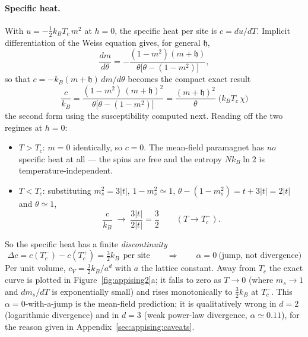 \documentclass[10pt,a4paper]{article}
\theoremstyle{remark}
\begin{document}
\paragraph{Specific heat.} With $u=-\tfrac12k_BT_c\,m^{2}$ at $h=0$, the specific
heat per site is $c=du/dT$. Implicit differentiation of the Weiss equation gives,
for general $\mathfrak{h}$,
\[
\frac{dm}{d\theta}=-\frac{(1-m^{2})(m+\mathfrak{h})}
{\theta\big[\theta-(1-m^{2})\big]} ,
\]
so that $c=-k_B(m+\mathfrak{h})\,dm/d\theta$ becomes the compact exact result
\[
\;
\frac{c}{k_B}=\frac{(1-m^{2})\,(m+\mathfrak{h})^{2}}
{\theta\big[\theta-(1-m^{2})\big]}
=\frac{(m+\mathfrak{h})^{2}}{\theta}\;\big(k_BT_c\,\chi\big)\
\]
the second form using the susceptibility computed next. Reading off the two
regimes at $h=0$:
\begin{itemize}
\item $T>T_c$: $m=0$ identically, so $c=0$. The mean-field paramagnet has
\emph{no} specific heat at all --- the spins are free and the entropy $N k_B\ln2$
is temperature-independent.
\item $T<T_c$: substituting $m_s^{2}=3|t|$, $1-m_s^{2}\simeq1$,
$\theta-(1-m_s^{2})=t+3|t|=2|t|$ and $\theta\simeq1$,
\[
\frac{c}{k_B}\;\longrightarrow\;\frac{3|t|}{2|t|}=\frac{3}{2}
\qquad (T\to T_c^{-}).
\]
\end{itemize}
So the specific heat has a finite \emph{discontinuity}
\[
\;\Delta c=c(T_c^{-})-c(T_c^{+})=\tfrac32 k_B\ \ \text{per site}
\qquad\Longrightarrow\qquad \alpha=0\ \text{(jump, not divergence)}\
\]
Per unit volume, $c_V=\tfrac32k_B/a^{d}$ with $a$ the lattice constant. Away from
$T_c$ the exact curve is plotted in Figure~\ref{fig:appising2}a; it falls to zero
as $T\to0$ (where $m_s\to1$ and $dm_s/dT$ is exponentially small) and rises
monotonically to $\tfrac32k_B$ at $T_c^{-}$. This $\alpha=0$-with-a-jump is the
mean-field prediction; it is qualitatively wrong in $d=2$ (logarithmic divergence)
and in $d=3$ (weak power-law divergence, $\alpha\simeq0.11$), for the reason given
in Appendix~\ref{sec:appising:caveats}.
\end{document}
